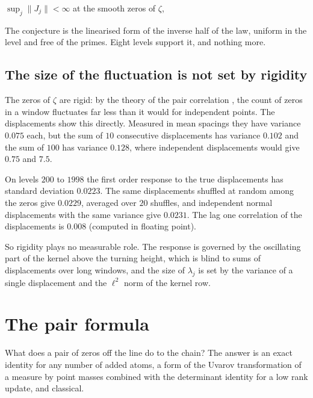 \begin{conjecture}\label{pp:conj:norm}
$\sup_j\|J_j\|<\infty$ at the smooth zeros of $\zeta$, 
\end{conjecture}

The conjecture is the linearised form of the inverse half of the law, uniform in the level and free of the primes. Eight levels support it, and nothing more.

\subsection{The size of the fluctuation is not set by rigidity}

The zeros of $\zeta$ are rigid: by the theory of the pair correlation \cite{Montgomery73}, the count of zeros in a window fluctuates far less than it would for independent points. The displacements show this directly. Measured in mean spacings they have variance $0.075$ each, but the sum of $10$ consecutive displacements has variance $0.102$ and the sum of $100$ has variance $0.128$, where independent displacements would give $0.75$ and $7.5$.

\begin{computation}\label{pp:comp:rigid}
On levels $200$ to $1998$ the first order response to the true displacements has standard deviation $0.0223$. The same displacements shuffled at random among the zeros give $0.0229$, averaged over $20$ shuffles, and independent normal displacements with the same variance give $0.0231$. The lag one correlation of the displacements is $0.008$ (computed in floating point).
\end{computation}

So rigidity plays no measurable role. The response is governed by the oscillating part of the kernel above the turning height, which is blind to sums of displacements over long windows, and the size of $\lambda_j$ is set by the variance of a single displacement and the $\ell^2$ norm of the kernel row.

\section{The pair formula}\label{pp:sec:pair}

What does a pair of zeros off the line do to the chain? The answer is an exact identity for any number of added atoms, a form of the Uvarov transformation of a measure by point masses \cite{Uvarov69} combined with the determinant identity for a low rank update, and classical.

